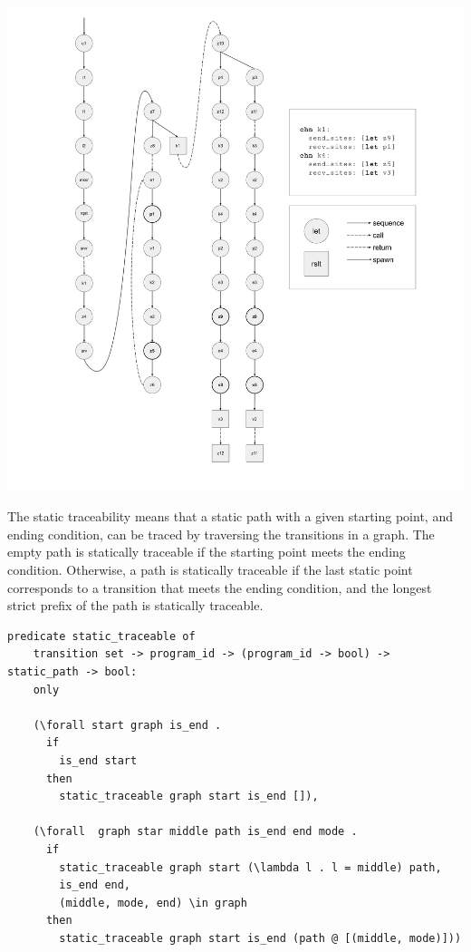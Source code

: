 \documentclass[10pt]{article}
\begin{document}
\includegraphics[width=1.3\textwidth, left]{cml_graph.pdf}

The static traceability means that a static path with a given starting point, and ending
condition, can be traced by traversing the transitions in a graph.
The empty path is statically traceable if the starting point meets the ending condition.
Otherwise, a path is statically traceable if the last static point corresponds to a transition
that meets the ending condition, and the longest strict prefix of the path is statically
traceable.  

\begin{lstlisting}[language=logic, mathescape]
  predicate static_traceable of
    transition set -> program_id -> (program_id -> bool) -> static_path -> bool:
    only

    (\forall start graph is_end .
      if
        is_end start
      then
        static_traceable graph start is_end []),

    (\forall  graph star middle path is_end end mode .
      if 
        static_traceable graph start (\lambda l . l = middle) path, 
        is_end end, 
        (middle, mode, end) \in graph 
      then
        static_traceable graph start is_end (path @ [(middle, mode)]))
  \end{lstlisting}
\end{document}
